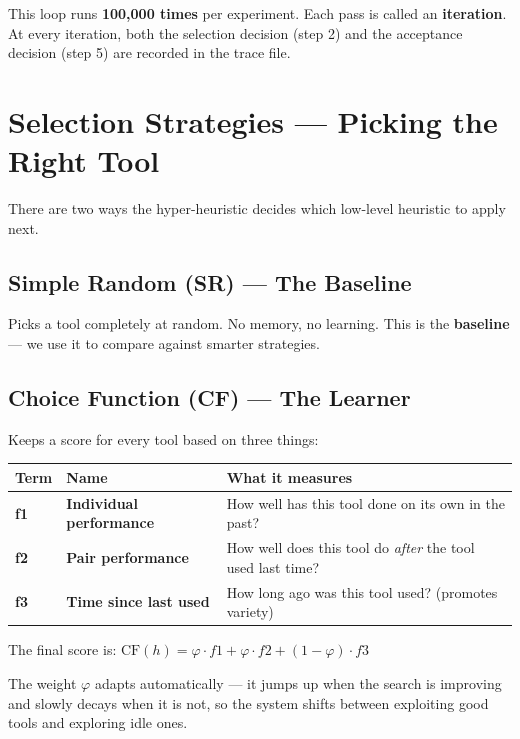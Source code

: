 \documentclass[12pt, a4paper]{article}
\begin{document}
This loop runs \textbf{100,000 times} per experiment. Each pass is called an
\textbf{iteration}. At every iteration, both the selection decision (step 2)
and the acceptance decision (step 5) are recorded in the trace file.

\section{Selection Strategies --- Picking the Right Tool}

There are two ways the hyper-heuristic decides which low-level heuristic to
apply next.

\subsection{Simple Random (SR) --- The Baseline}
Picks a tool completely at random. No memory, no learning. This is the
\textbf{baseline} --- we use it to compare against smarter strategies.

\subsection{Choice Function (CF) --- The Learner}
Keeps a score for every tool based on three things:

\begin{center}
\begin{tabularx}{\linewidth}{>{\bfseries}p{1cm} >{\bfseries}p{4cm} X}
\toprule
Term & Name & What it measures \\
\midrule
f1 & Individual performance & How well has this tool done on its own in the past? \\[4pt]
f2 & Pair performance & How well does this tool do \emph{after} the tool used last time? \\[4pt]
f3 & Time since last used & How long ago was this tool used? (promotes variety) \\
\bottomrule
\end{tabularx}
\end{center}

The final score is: $\text{CF}(h) = \varphi \cdot f1 + \varphi \cdot f2 + (1-\varphi) \cdot f3$

The weight $\varphi$ adapts automatically --- it jumps up when the search is
improving and slowly decays when it is not, so the system shifts between
exploiting good tools and exploring idle ones.

\end{document}
